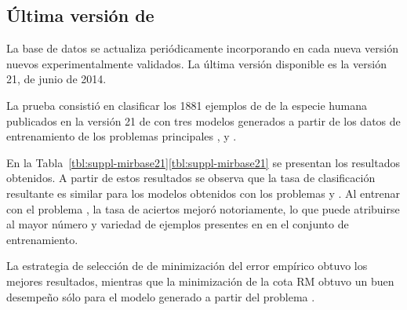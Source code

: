 %
%
\subsection{Última versión de \mirbase}
%
La base de datos \work\mirbase{} se actualiza periódicamente
incorporando en cada nueva versión nuevos 
experimentalmente validados.
La última versión disponible es la versión 21, de junio de 2014.

La prueba consistió en clasificar los 1881 ejemplos de  de
la especie humana publicados en la versión 21 de \work\mirbase{}
con tres modelos generados a partir de los datos de entrenamiento de
los problemas principales \prob\tripletsvm{}, \prob\mipred{} y
\prob\micropred{}.

En la \iflatexml{}Tabla~\ref{tbl:suppl-mirbase21}\else\autoref{tbl:suppl-mirbase21}\fi{}
se presentan los resultados obtenidos.
A partir de estos resultados se observa que la tasa de clasificación
resultante es similar para los modelos obtenidos con los problemas
\prob\tripletsvm{} y \prob\mipred{}.
Al entrenar con el problema \prob\micropred{}, la tasa de aciertos
mejoró notoriamente, lo que puede atribuirse al mayor número y
variedad de ejemplos presentes en en el conjunto de entrenamiento.

La estrategia de selección de  de minimización del error
empírico obtuvo los mejores resultados, mientras que la minimización
de la cota RM obtuvo un buen desempeño sólo para el modelo generado a
partir del problema \prob\micropred{}.
